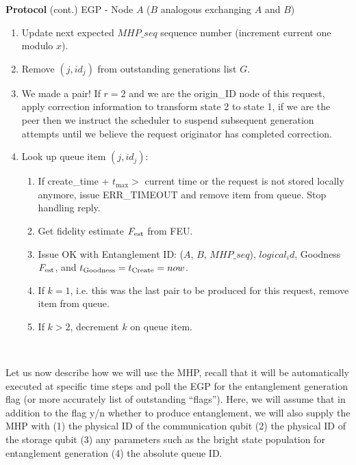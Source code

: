 \documentclass{article}
\makeatletter
\newcounter{Lprotocol}
\newenvironment{Lprotocol}[1]
  {\par\addvspace{\topsep}
   \noindent
   \tabularx{\linewidth}{@{} X @{}}
    \hline
    \refstepcounter{Lprotocol}\textbf{Protocol \theLprotocol} #1 \\
    \hline}
  { \\
    \hline
   \endtabularx
   \par\addvspace{\topsep}}
\makeatother
\begin{document}
\addtocounter{Lprotocol}{-1}
\begin{Lprotocol}{(cont.) EGP - Node $A$ ($B$ analogous exchanging $A$ and $B$)}
\begin{enumerate}
   \begin{enumerate}
   \begin{enumerate}
   \setcounter{enumiii}{\theenumTemp}
    \item Update next expected $MHP\_seq$ sequence number (increment current one modulo $x$).
     \item Remove $(j,id_j)$ from outstanding generations list $G$.
     \item We made a pair! If $r=2$ and we are the origin\_ID node of this request, apply correction information to transform state 2 to state 1, if we are the peer then we instruct the scheduler to suspend subsequent generation attempts until we believe the request originator has completed correction.
     \item Look up queue item $(j,id_j)$:
	 \begin{enumerate}
		\item If create\_time + $t_{\max} >$ current time or the request is not stored locally anymore, issue ERR\_TIMEOUT and remove item from queue. Stop handling reply.
		\item Get fidelity estimate $F_{\rm est}$ from FEU.
		\item Issue OK with Entanglement ID: ($A$, $B$, $MHP\_seq$), $logical_id$, Goodness $F_{\rm est}$, and $t_{\rm Goodness} = t_{\rm Create} = now$.
		\item If $k = 1$, i.e. this was the last pair to be produced for this request, remove item from queue.
		\item If $k > 2$, decrement $k$ on queue item.
	 \end{enumerate}
	\end{enumerate}
  \end{enumerate}
\end{enumerate}

\end{Lprotocol}

Let us now describe how we will use the MHP, recall that it will be automatically executed at specific time steps and poll the EGP for the entanglement generation flag (or more accurately list of outstanding ``flags''). Here, we will assume that in addition to the flag y/n whether to produce entanglement, we will also supply the MHP with (1) the physical ID of the communication qubit (2) the physical ID of the storage qubit (3) any parameters such as the bright state population for entanglement generation (4) the absolute queue ID.
\end{document}
